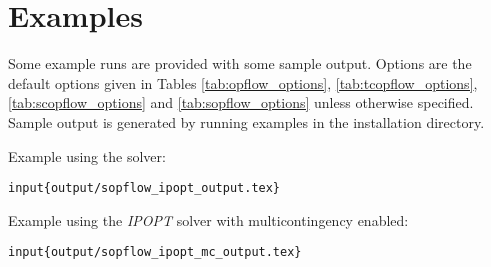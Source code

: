 
\section{Examples}
Some \sopflow example runs are provided with some sample output. Options are the default options given in Tables \ref{tab:opflow_options}, \ref{tab:tcopflow_options}, \ref{tab:scopflow_options} and \ref{tab:sopflow_options} unless otherwise specified. Sample output is generated by running examples in the installation directory.

Example using the \ipopt solver:

\begin{lstlisting}
input{output/sopflow_ipopt_output.tex}
\end{lstlisting}

Example using the \emph{IPOPT} solver with multicontingency enabled:

\begin{lstlisting}
input{output/sopflow_ipopt_mc_output.tex}
\end{lstlisting}
